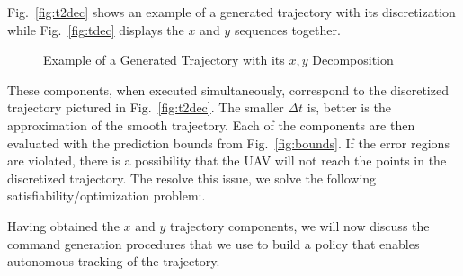 \documentclass[letterpaper, 10 pt, conference]{ieeeconf}  %
\newcommand\NB[1]{$\spadesuit$\footnote{NB: #1}}
\begin{document}
Fig.~\ref{fig:t2dec} shows an example of a generated trajectory with its discretization while Fig.~\ref{fig:tdec} displays the $x$ and $y$ sequences together.
\begin{figure}[h]
	\centering
	\caption{Example of a Generated Trajectory with its $x,y$ Decomposition}
	\label{fig:trajdec}
\end{figure}

These components, when executed simultaneously, correspond to the discretized trajectory pictured in Fig.~\ref{fig:t2dec}. The smaller $\Delta t$ is, better is the approximation of the smooth trajectory. Each of the components are then evaluated with the prediction bounds from Fig.~\ref{fig:bounds}. If the error regions are violated, there is a possibility that the UAV will not reach the points in the discretized trajectory. The resolve this issue, we solve the following satisfiability/optimization problem:.


Having obtained the $x$ and $y$ trajectory components, we will now discuss the command generation procedures that we use to build a policy that enables autonomous tracking of the trajectory.
\end{document}
